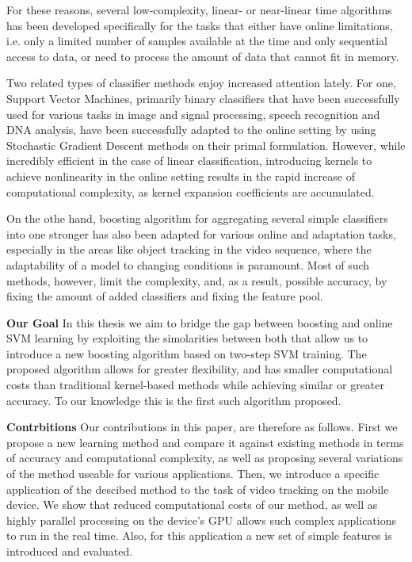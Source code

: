 For these reasons, several low-complexity, linear- or near-linear time algorithms has been developed specifically for the tasks that either have online limitations, i.e. only a limited number of samples available at the time and only sequential access to data, or need to process the amount of data that cannot fit in memory.

Two related types of classifier methods enjoy increased attention lately. For one, Support Vector Machines, primarily binary classifiers that have been successfully used for various tasks in image and signal processing, speech recognition and DNA analysis, have been successfully adapted to the online setting by using Stochastic Gradient Descent methods on their primal formulation. However, while incredibly efficient in the case of linear classification, introducing kernels to achieve nonlinearity in the online setting results in the  rapid increase of computational complexity, as kernel expansion coefficients are accumulated. 

On the othe hand, boosting algorithm for aggregating several simple classifiers into one stronger has also been adapted for various online and adaptation tasks, especially in the areas like object tracking in the video sequence, where the adaptability of a model to changing conditions is paramount. Most of such methods, however, limit the complexity, and, as a result, possible accuracy, by fixing the amount of added classifiers and fixing the feature pool. 

{\bf Our Goal} In this thesis we aim to bridge the gap between boosting and online SVM learning by exploiting the simolarities between both that allow us to introduce a new boosting algorithm based on two-step SVM training. The proposed algorithm allows for greater flexibility, and has smaller computational costs than traditional kernel-based methods while achieving similar or greater accuracy. To our knowledge this is the first such algorithm proposed. 

{\bf Contrbitions} Our contributions in this paper, are therefore as follows. First we propose a new learning method and compare it against existing methods in terms of accuracy and computational complexity, as well as proposing several variations of the method useable for various applications. Then, we introduce a specific application of the descibed method to the task of video tracking on the mobile device. We show that reduced computational costs of our method, as well as highly parallel processing on the device's GPU allows such complex applications to run in the real time. Also, for this application a new set of simple features is introduced and evaluated.

